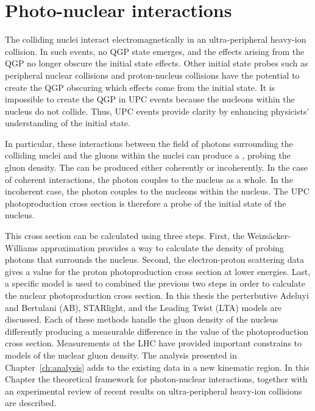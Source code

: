 \chapter{Photo-nuclear interactions \label{ch:photoNuc}}
    The colliding nuclei interact electromagnetically in an ultra-peripheral 
      heavy-ion collision.    
    In such events, no QGP state emerges, and the effects arising from the QGP 
      no longer obscure the initial state effects.
    Other initial state probes such as peripheral nuclear collisions and 
      proton-nucleus collisions have the potential to create the QGP obscuring 
      which effects come from the initial state.
    It is impossible to create the QGP in UPC events because the nucleons 
      within the nucleus do not collide. 
    Thus, UPC events provide clarity by enhancing physicists' 
      understanding of the initial state. 
    
    In particular, these interactions between the field of photons surrounding 
      the colliding nuclei and the gluons within the nuclei can produce a 
      \JPsi{}, probing the gluon density.
    The \JPsi{} can be produced either coherently or incoherently. 
    In the case of coherent interactions, the photon couples to the nucleus 
      as a whole.
    In the incoherent case, the photon couples to the nucleons within the 
      nucleus.
    The UPC \JPsi{} photoproduction cross section is therefore a probe of 
      the initial state of the nucleus.

    This cross section can be calculated using three steps.   
    First, the Weizs\"{a}cker-Williams approximation provides a way to calculate the 
      density of probing photons that surrounds the nucleus. 
    Second, the electron-proton scattering data gives a value for the proton 
      photoproduction cross section at lower energies.
    Last, a specific model is used to combined the previous two steps in order
      to calculate the nuclear photoproduction cross section. 
    In this thesis the perterbutive Adeluyi and Bertulani (AB), STARlight, and 
      the Leading Twist (LTA) models are discussed. 
    Each of these methods handle the gluon density of the nucleus differently 
      producing a measurable difference in the value of the \JPsi{} 
      photoproduction cross section.
    Measurements at the LHC have provided important constrains to models of the 
      nuclear gluon density.
    The analysis presented in Chapter~\ref{ch:analysis} adds to the existing 
      data in a new kinematic region.
    In this Chapter the theoretical framework for photon-nuclear
      interactions, together with an experimental review of recent results on 
      ultra-peripheral heavy-ion collisions are described. 

